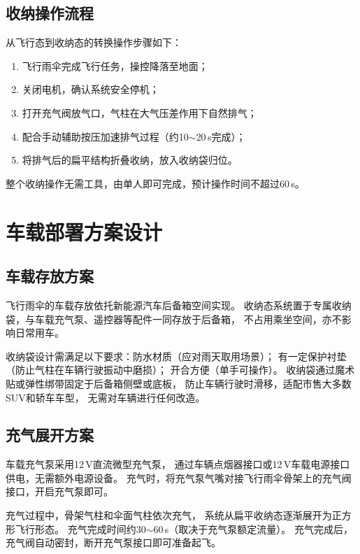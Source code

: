 \subsection{收纳操作流程}

从飞行态到收纳态的转换操作步骤如下：

\begin{enumerate}
    \item 飞行雨伞完成飞行任务，操控降落至地面；
    \item 关闭电机，确认系统安全停机；
    \item 打开充气阀放气口，气柱在大气压差作用下自然排气；
    \item 配合手动辅助按压加速排气过程（约10$\sim$20\,s完成）；
    \item 将排气后的扁平结构折叠收纳，放入收纳袋归位。
\end{enumerate}

整个收纳操作无需工具，由单人即可完成，预计操作时间不超过60\,s。


\section{车载部署方案设计}

\subsection{车载存放方案}

飞行雨伞的车载存放依托新能源汽车后备箱空间实现。
收纳态系统置于专属收纳袋，与车载充气泵、遥控器等配件一同存放于后备箱，
不占用乘坐空间，亦不影响日常用车。

收纳袋设计需满足以下要求：防水材质（应对雨天取用场景）；
有一定保护衬垫（防止气柱在车辆行驶振动中磨损）；
开合方便（单手可操作）。
收纳袋通过魔术贴或弹性绑带固定于后备箱侧壁或底板，
防止车辆行驶时滑移，适配市售大多数SUV和轿车车型，
无需对车辆进行任何改造。

\subsection{充气展开方案}

车载充气泵采用12\,V直流微型充气泵，
通过车辆点烟器接口或12\,V车载电源接口供电，无需额外电源设备。
充气时，将充气泵气嘴对接飞行雨伞骨架上的充气阀接口，开启充气泵即可。

充气过程中，骨架气柱和伞面气柱依次充气，
系统从扁平收纳态逐渐展开为正方形飞行形态。
充气完成时间约30$\sim$60\,s（取决于充气泵额定流量）。
充气完成后，充气阀自动密封，断开充气泵接口即可准备起飞。

